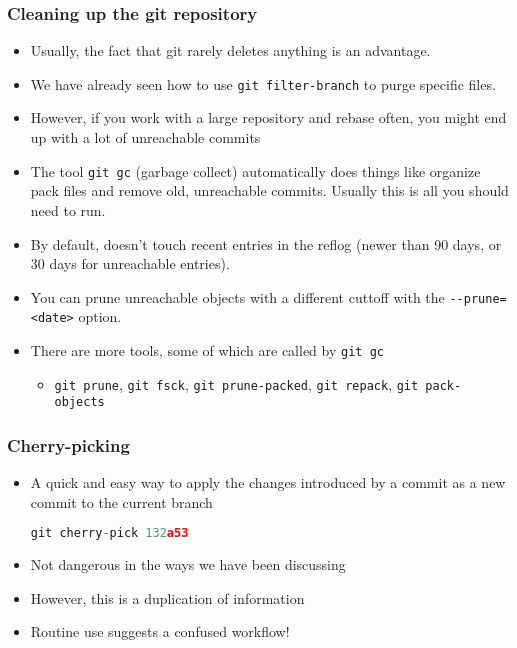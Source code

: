 \begin{frame}[fragile]
\frametitle{Cleaning up the git repository}
\begin{itemize}
\item Usually, the fact that git rarely deletes anything is an advantage.
\item We have already seen how to use \lstinline{git filter-branch} to purge specific files.
\item However, if you work with a large repository and rebase often, you might end up with a lot of unreachable commits
\item The tool \lstinline{git gc} (garbage collect) automatically does things like organize pack files and remove old, unreachable commits. Usually this is all you should need to run.
\item By default, doesn't touch recent entries in the reflog (newer than 90 days, or 30 days for unreachable entries).
\item You can prune unreachable objects with a different cuttoff with the \lstinline{--prune=<date>} option.
\item There are more tools, some of which are called by \lstinline{git gc}
\begin{itemize}
\item \lstinline{git prune}, \lstinline{git fsck}, \lstinline{git prune-packed}, \lstinline{git repack}, \lstinline{git pack-objects}
\end{itemize}
\end{itemize}
\end{frame}

\begin{frame}[fragile]
\frametitle{Cherry-picking}
\begin{itemize}
\item A quick and easy way to apply the changes introduced by a commit as a new commit to the current branch
\begin{lstlisting}[language=C++]
git cherry-pick 132a53
\end{lstlisting}
\item Not dangerous in the ways we have been discussing
\item However, this is a duplication of information
\item Routine use suggests a confused workflow!
\end{itemize}
\end{frame}

